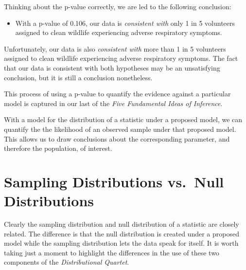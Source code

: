 \documentclass[
  letterpaper,
  DIV=11,
  numbers=noendperiod]{scrreprt}
\providecommand{\tightlist}{%
  \setlength{\itemsep}{0pt}\setlength{\parskip}{0pt}}\usepackage{longtable,booktabs,array}
\theoremstyle{definition}
\theoremstyle{definition}
\theoremstyle{plain}
\theoremstyle{remark}
\begin{document}
Thinking about the p-value correctly, we are led to the following
conclusion:

\begin{itemize}
\tightlist
\item
  With a p-value of 0.106, our data is \emph{consistent with} only 1 in
  5 volunteers assigned to clean wildlife experiencing adverse
  respiratory symptoms.
\end{itemize}

Unfortunately, our data is also \emph{consistent with} more than 1 in 5
volunteers assigned to clean wildlife experiencing adverse respiratory
symptoms. The fact that our data is consistent with both hypotheses may
be an unsatisfying conclusion, but it is still a conclusion nonetheless.

This process of using a p-value to quantify the evidence against a
particular model is captured in our last of the \emph{Five Fundamental
Ideas of Inference}.

\begin{tcolorbox}[enhanced jigsaw, colbacktitle=quarto-callout-important-color!10!white, colback=white, left=2mm, title=\textcolor{quarto-callout-important-color}{\faExclamation}\hspace{0.5em}{Fundamental Idea V}, toptitle=1mm, leftrule=.75mm, breakable, bottomrule=.15mm, arc=.35mm, rightrule=.15mm, toprule=.15mm, coltitle=black, opacityback=0, colframe=quarto-callout-important-color-frame, opacitybacktitle=0.6, bottomtitle=1mm, titlerule=0mm]

With a model for the distribution of a statistic under a proposed model,
we can quantify the the likelihood of an observed sample under that
proposed model. This allows us to draw conclusions about the
corresponding parameter, and therefore the population, of interest.

\end{tcolorbox}

\section{Sampling Distributions vs.~Null
Distributions}\label{sampling-distributions-vs.-null-distributions}

Clearly the sampling distribution and null distribution of a statistic
are closely related. The difference is that the null distribution is
created under a proposed model while the sampling distribution lets the
data speak for itself. It is worth taking just a moment to highlight the
differences in the use of these two components of the
\emph{Distributional Quartet}.
\end{document}

